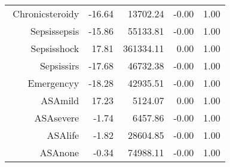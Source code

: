 \begin{tabular}{rrrrr}
$$  Chronic\-steroid\-y & -16.64 & 13702.24 & -0.00 & 1.00 \\ 
  Sepsis\-sepsis & -15.86 & 55133.81 & -0.00 & 1.00 \\ 
  Sepsis\-shock & 17.81 & 361334.11 & 0.00 & 1.00 \\ 
  Sepsis\-sirs & -17.68 & 46732.38 & -0.00 & 1.00 \\ 
  Emergency\-y & -18.28 & 42935.51 & -0.00 & 1.00 \\ 
  ASA\-mild & 17.23 & 5124.07 & 0.00 & 1.00 \\ 
  ASA\-severe & -1.74 & 6457.86 & -0.00 & 1.00 \\ 
  ASA\-life & -1.82 & 28604.85 & -0.00 & 1.00 \\ 
  ASA\-none & -0.34 & 74988.11 & -0.00 & 1.00 \\ 
   \hline
\end{tabular}

